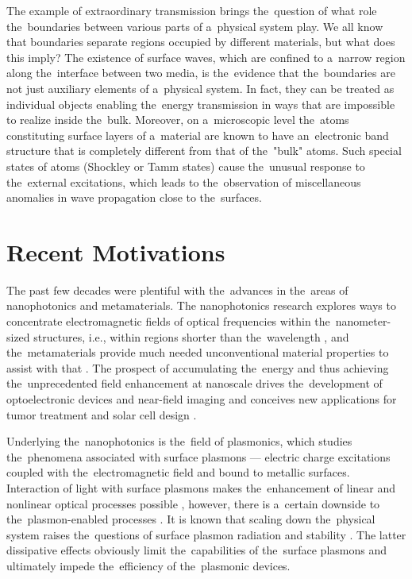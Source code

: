 The example of extraordinary transmission brings the~question of what role the~boundaries between various parts of a~physical system play.
We all know that boundaries separate regions occupied by different materials, but what does this imply?
The existence of surface waves, which are confined to a~narrow region along the~interface between two media, is the~evidence that the~boundaries are not just auxiliary elements of a~physical system.
In fact, they can be treated as individual objects enabling the~energy transmission in ways that are impossible to realize inside the~bulk.
Moreover, on a~microscopic level the~atoms constituting surface layers of a~material are known to have an~electronic band structure that is completely different from that of the~"bulk" atoms.
Such special states of atoms (Shockley \cite{shockley} or Tamm \cite{tamm} states) cause the~unusual response to the~external excitations, which leads to the~observation of miscellaneous anomalies in wave propagation close to the~surfaces.

\section{Recent Motivations}

The past few decades were plentiful with the~advances in the~areas of nanophotonics and metamaterials.
The nanophotonics research explores ways to concentrate electromagnetic fields of optical frequencies within the~nanometer-sized structures, i.e., within regions shorter than the~wavelength \cite{maier2}, and the~metamaterials provide much needed unconventional material properties to assist with that \cite{shalaev}.
The prospect of accumulating the~energy and thus achieving the~unprecedented field enhancement at nanoscale drives the~development of optoelectronic devices and near-field imaging and conceives new applications for tumor treatment and solar cell design \cite{smallworld,notsosmall,schuller}.

Underlying the~nanophotonics is the~field of plasmonics, which studies the~phenomena associated with surface plasmons --- electric charge excitations coupled with the~electromagnetic field and bound to metallic surfaces.
Interaction of light with surface plasmons makes the~enhancement of linear and nonlinear optical processes possible \cite{stockman}, however, there is a~certain downside to the~plasmon-enabled processes \cite{khurgin1}.
It is known that scaling down the~physical system raises the~questions of surface plasmon radiation \cite{khurgin2,khurgin3} and stability \cite{gumbs}.
The latter dissipative effects obviously limit the~capabilities of the~surface plasmons and ultimately impede the~efficiency of the~plasmonic devices.

